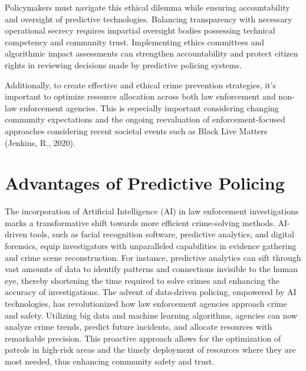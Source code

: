 \documentclass[man, noextraspace]{apa7} %
\begin{document}
Policymakers must navigate this ethical dilemma while ensuring accountability and 
oversight of predictive technologies. Balancing transparency with necessary operational secrecy 
requires impartial oversight bodies possessing technical competency and community trust. 
Implementing ethics committees and algorithmic impact assessments can strengthen 
accountability and protect citizen rights in reviewing decisions made by predictive policing 
systems.

Additionally, to create effective and ethical crime prevention strategies, it's important to 
optimize resource allocation across both law enforcement and non-law enforcement agencies. 
This is especially important considering changing community expectations and the ongoing 
reevaluation of enforcement-focused approaches considering recent societal events such as Black 
Live Matters (Jenkins, R., 2020).\vspace{1cm}

\section{Advantages of Predictive Policing}
The incorporation of Artificial Intelligence (AI) in law enforcement investigations marks a transformative shift towards more efficient crime-solving methods. AI-driven tools, such as facial recognition software, predictive analytics, and digital forensics, equip investigators with unparalleled capabilities in evidence gathering and crime scene reconstruction. For instance, predictive analytics can sift through vast amounts of data to identify patterns and connections invisible to the human eye, thereby shortening the time required to solve crimes and enhancing the accuracy of investigations. The advent of data-driven policing, empowered by AI technologies, has revolutionized how law enforcement agencies approach crime and safety. Utilizing big data and machine learning algorithms, agencies can now analyze crime trends, predict future incidents, and allocate resources with remarkable precision. This proactive approach allows for the optimization of patrols in high-risk areas and the timely deployment of resources where they are most needed, thus enhancing community safety and trust. 
\end{document}

